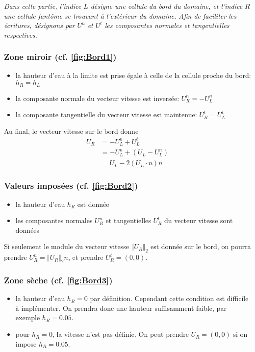 \documentclass[
	french,
	11pt, %
]{fphw}
\begin{document}
\textit{Dans cette partie, l'indice $L$ désigne une cellule du bord du domaine, et l'indice $R$ une cellule fantôme se trouvant à l'extérieur du domaine. Afin de faciliter les écritures, désignons par $U^n$ et $U^t$ les composantes normales et tangentielles respectives.}

\subsubsection*{Zone miroir (cf. \cref{fig:Bord1})}
\begin{itemize}
	\item la hauteur d'eau à la limite est prise égale à celle de la cellule proche du bord: $h_R = h_L$
	\item la composante normale du vecteur vitesse est inversée: $U_R^n = -U_L^n$ 
	\item la composante tangentielle du vecteur vitesse est maintenue: $U_R^t = U_L^t$
\end{itemize}
Au final, le vecteur vitesse sur le bord donne
\begin{align*}
	U_R &= -U^n_L + U^t_L \\
	&= -U^n_L + (U_L -U^n_L) \\
	&= U_L - 2(U_L \cdot n)n 
\end{align*}  

\subsubsection*{Valeurs imposées (cf. \cref{fig:Bord2})}
\begin{itemize}
	\item la hauteur d'eau $h_R$ est donnée
	\item les composantes normales $U_R^n$ et tangentielles $U_R^t$ du vecteur vitesse sont données 
\end{itemize}
Si seulement le module du vecteur vitesse $\Vert U_R \Vert_2$ est donnée sur le bord, on pourra prendre $U_R^n = \Vert U_R \Vert_2 n$, et prendre $U_R^t = (0,0)$.

\subsubsection*{Zone sèche (cf. \cref{fig:Bord3})}
\begin{itemize}
	\item la hauteur d'eau $h_R = 0$ par définition. Cependant cette condition est difficile à implémenter. On prendra donc une hauteur suffisamment faible, par exemple $h_R = 0.05$.
	\item pour $h_R=0$, la vitesse n'est pas définie. On peut prendre $U_R = (0,0)$ si on impose $h_R = 0.05$.
\end{itemize}
\end{document}
